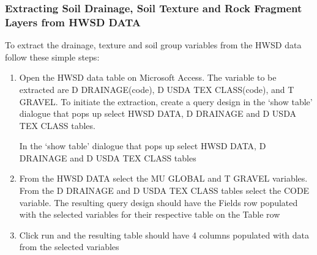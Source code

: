 \documentclass[letterpaper,10pt,english]{sphinxmanual}
\begin{document}
\subsubsection{Extracting Soil Drainage, Soil Texture and Rock Fragment Layers from HWSD DATA}
\label{\detokenize{Qgis_Plugin/Calculate_medalus:extracting-soil-drainage-soil-texture-and-rock-fragment-layers-from-hwsd-data}}
\sphinxAtStartPar
To extract the drainage, texture and soil group variables from the HWSD data follow these
simple steps:
\begin{enumerate}
%
\item {} 
\sphinxAtStartPar
Open the HWSD data table on Microsoft Access. The variable to be extracted are D DRAINAGE(code),
D USDA TEX CLASS(code), and T GRAVEL. To initiate the extraction, create a query design in the ‘show table’
dialogue that pops up select HWSD DATA, D DRAINAGE and D USDA TEX CLASS tables.


\sphinxAtStartPar
In the ‘show table’ dialogue that pops up select HWSD DATA, D DRAINAGE and D USDA TEX CLASS tables


\item {} 
\sphinxAtStartPar
From the HWSD DATA select the MU GLOBAL and T GRAVEL variables. From the D DRAINAGE and D USDA TEX CLASS tables
select the CODE variable. The resulting query design should have the Fields row populated with the selected variables for
their respective table on the Table row


\item {} 
\sphinxAtStartPar
Click run and the resulting table should have 4 columns populated with data from the
selected variables




\end{enumerate}
\end{document}
